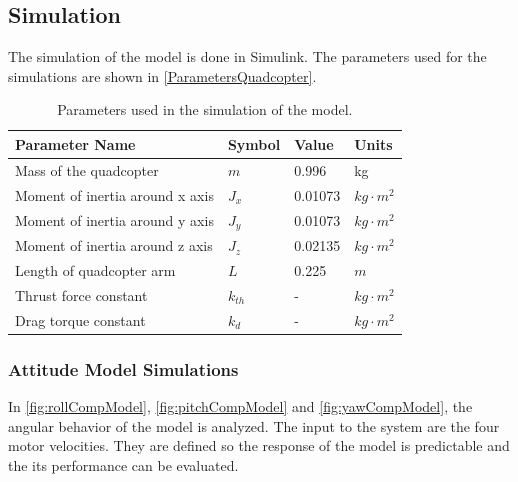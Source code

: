 \subsection{Simulation}
The simulation of the model is done in Simulink. The parameters used for the simulations are shown in \autoref{ParametersQuadcopter}.
\begin{table}[H]
	\centering
	\begin{tabular}{|l|l|l|p{3cm}|}
		\hline %
		\textbf{Parameter Name}&\textbf{Symbol} &\textbf{Value} &\textbf{Units}\\
		\hline %
		Mass of the quadcopter  & $m$ & 0.996       &kg\\
		\hline
		Moment of inertia around x axis       & $J_x$  & 0.01073       & $kg \cdot m^2$\\
		\hline %
		Moment of inertia around y axis       & $J_y$  & 0.01073       & $kg \cdot m^2$\\
		\hline %
		Moment of inertia around z axis       & $J_z$  & 0.02135       & $kg \cdot m^2$\\
		\hline %
		Length of quadcopter arm       & $L$  &   0.225       & $m$\\
		\hline %
		Thrust force constant       & $k_{th}$  & -       & $kg \cdot m^2$\\
		\hline %
		Drag torque constant      & $k_{d}$  & -       & $kg \cdot m^2$\\
		\hline %
	\end{tabular}
	\caption{Parameters used in the simulation of the model.}
	\label{ParametersQuadcopter}
\end{table}\vspace{-18pt}

\subsubsection{Attitude Model Simulations}
In \autoref{fig:rollCompModel}, \ref{fig:pitchCompModel} and \ref{fig:yawCompModel}, the angular behavior of the model is analyzed. The input to the system are the four motor velocities. They are defined so the response of the model is predictable and the its performance can be evaluated.

